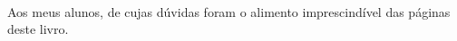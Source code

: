 

~
\vfill

Aos meus alunos, de cujas dúvidas foram o alimento imprescindível das páginas deste livro. 